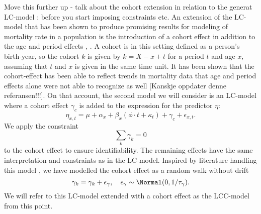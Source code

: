 \newline
\textcolor{myDarkGreen}{Move this further up - talk about the cohort extension in relation to the generat LC-model : before you start imposing constraints etc. }
An extension of the LC-model that has been shown to produce promising results for modeling of mortality rate in a population is the introduction of a cohort effect in addition to the age and period effects \cite{booth_tickle_2008}, \cite{Wisniowski2015}. A cohort is in this setting defined as a person's birth-year, so the cohort $k$ is given by $k = X - x + t$ for a period $t$ and age $x$, assuming that $t$ and $x$ is given in the same time unit. It has been shown that the cohort-effect has been able to reflect trends in mortality data that age and period effects alone were not able to recognize as well \cite{Wisniowski2015}[Kanskje oppdater denne referansen!!!]. On that account, the second model we will consider is an LC-model where a cohort effect $\gamma_c$ is added to the expression for the predictor $\eta$:
\begin{equation}
    \eta_{x,t} = \mu + \alpha_x + \beta_x(\phi \cdot t + \kappa_t) + \gamma_c + \epsilon_{x,t}.
    \label{eq:LCC-model}
\end{equation}
We apply the constraint 
\begin{equation}
    \sum_k \gamma_k = 0
    \label{eq:cohort-constraint}
\end{equation}
to the cohort effect to ensure identifiability. The remaining effects have the same interpretation and constraints as in the LC-model. Inspired by literature handling this model \cite{Wisniowski2015}, we have modelled the cohort effect as a random walk without drift
\begin{equation}
    \gamma_k = \gamma_k + \epsilon_\gamma, \quad \epsilon_\gamma \sim \Normal(0, 1/\tau_\gamma).
    \label{eq:cohort-rw}
\end{equation}
We will refer to this LC-model extended with a cohort effect as the LCC-model from this point.
